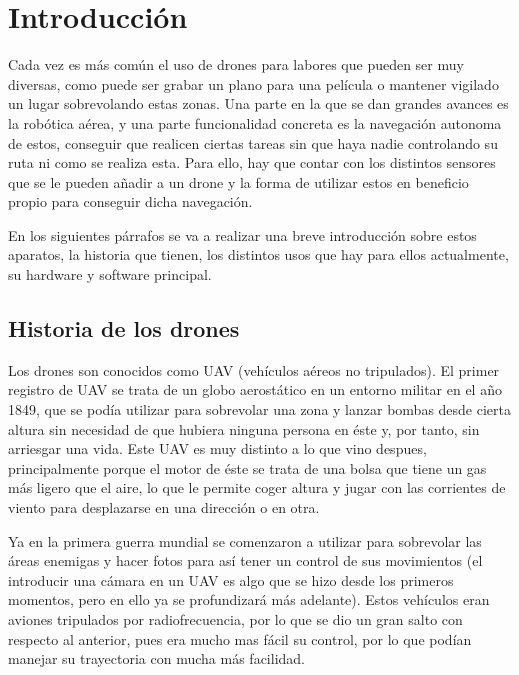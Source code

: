 \chapter{Introducci\'on}\label{cap.introduccion}
\hspace{1 cm}Cada vez es m\'as com\'un el uso de drones para labores que pueden ser muy diversas, como puede ser grabar un plano para una pel\'icula o mantener vigilado un lugar sobrevolando estas zonas. Una parte en la que se dan grandes avances es la rob\'otica a\'erea, y una parte funcionalidad concreta es la navegaci\'on autonoma de estos, conseguir que realicen ciertas tareas sin que haya nadie controlando su ruta ni como se realiza esta. Para ello, hay que contar con los distintos sensores que se le pueden añadir a un drone y la forma de utilizar estos en beneficio propio para conseguir dicha navegaci\'on.

\hspace{1cm} En los siguientes p\'arrafos se va a realizar una breve introducci\'on sobre estos aparatos, la historia que tienen, los distintos usos que hay para ellos actualmente, su hardware y software principal.

\section{Historia de los drones}

\hspace{1cm} Los drones son conocidos como UAV (veh\'iculos a\'ereos no tripulados). El primer registro de UAV se trata de un globo aerost\'atico en un entorno militar en el año 1849, que se pod\'ia utilizar para sobrevolar una zona y lanzar bombas desde cierta altura sin necesidad de que hubiera ninguna persona en \'este y, por tanto, sin arriesgar una vida. Este UAV es muy distinto a lo que vino despues, principalmente porque el motor de \'este se trata de una bolsa que tiene un gas m\'as ligero que el aire, lo que le permite coger altura y jugar con las corrientes de viento para desplazarse en una direcci\'on o en otra.

\hspace{1 cm} Ya en la primera guerra mundial se comenzaron a utilizar para sobrevolar las \'areas enemigas y hacer fotos para as\'i tener un control de sus movimientos (el introducir una c\'amara en un UAV es algo que se hizo desde los primeros momentos, pero en ello ya se profundizar\'a m\'as adelante). Estos veh\'iculos eran aviones tripulados por radiofrecuencia, por lo que se dio un gran salto con respecto al anterior, pues era mucho mas f\'acil su control, por lo que pod\'ian manejar su trayectoria con mucha m\'as facilidad. 

